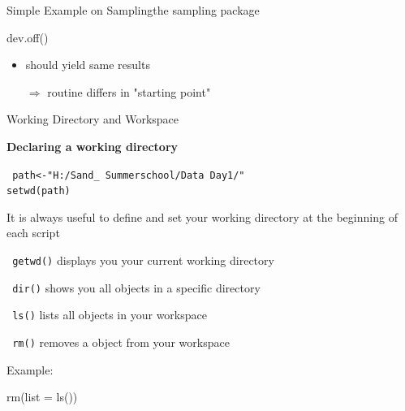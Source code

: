 \documentclass[11pt,german,hideothersubsections]{beamer}
\newcommand{\R}[1]{{\tt \color{blue}  #1}}
\begin{document}
\begin{frame}[fragile]{Simple Example on Sampling}{the sampling package}
\begin{minipage}{5.5cm}
\end{minipage}
\begin{Schunk}
\begin{Sinput}
 dev.off()
\end{Sinput}
\end{Schunk}
\begin{itemize}
\pause\item should yield same results
\item[$\Rightarrow$] routine differs in "starting point"
\end{itemize}
\end{frame}
\begin{frame}[fragile]{Working Directory and Workspace}
\footnotesize{
\begin{center}
\textbf{Declaring a working directory}\\
\end{center}
\R{path<-"H:/Sand\_ Summerschool/Data Day1/"\\
setwd(path)}}
\begin{itemize}
\footnotesize{
\item It is always useful to define and set your working directory at the beginning of each script
\item \R{getwd()} displays you your current working directory
\item \R{dir()} shows you all objects in a specific directory
\item \R{ls()} lists all objects in your workspace
\item \R{rm()} removes a object from your workspace
}
\end{itemize}
\footnotesize{
Example:\\
\begin{Schunk}
\begin{Sinput}
 rm(list = ls())
\end{Sinput}
\end{Schunk}
}

\end{frame}





\end{document}
